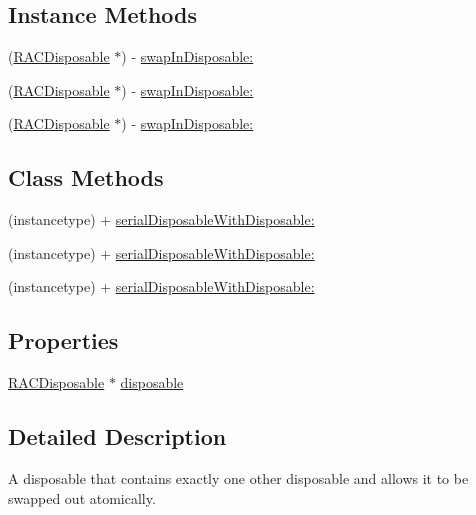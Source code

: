 \subsection*{Instance Methods}
\begin{DoxyCompactItemize}
\item 
(\mbox{\hyperlink{interface_r_a_c_disposable}{R\+A\+C\+Disposable}} $\ast$) -\/ \mbox{\hyperlink{interface_r_a_c_serial_disposable_ad850b6d2134907b94937832f1aea2d20}{swap\+In\+Disposable\+:}}
\item 
(\mbox{\hyperlink{interface_r_a_c_disposable}{R\+A\+C\+Disposable}} $\ast$) -\/ \mbox{\hyperlink{interface_r_a_c_serial_disposable_ad850b6d2134907b94937832f1aea2d20}{swap\+In\+Disposable\+:}}
\item 
(\mbox{\hyperlink{interface_r_a_c_disposable}{R\+A\+C\+Disposable}} $\ast$) -\/ \mbox{\hyperlink{interface_r_a_c_serial_disposable_ad850b6d2134907b94937832f1aea2d20}{swap\+In\+Disposable\+:}}
\end{DoxyCompactItemize}
\subsection*{Class Methods}
\begin{DoxyCompactItemize}
\item 
(instancetype) + \mbox{\hyperlink{interface_r_a_c_serial_disposable_a4d1effa565e832a3d4cea3257745f2c6}{serial\+Disposable\+With\+Disposable\+:}}
\item 
(instancetype) + \mbox{\hyperlink{interface_r_a_c_serial_disposable_a4d1effa565e832a3d4cea3257745f2c6}{serial\+Disposable\+With\+Disposable\+:}}
\item 
(instancetype) + \mbox{\hyperlink{interface_r_a_c_serial_disposable_a4d1effa565e832a3d4cea3257745f2c6}{serial\+Disposable\+With\+Disposable\+:}}
\end{DoxyCompactItemize}
\subsection*{Properties}
\begin{DoxyCompactItemize}
\item 
\mbox{\hyperlink{interface_r_a_c_disposable}{R\+A\+C\+Disposable}} $\ast$ \mbox{\hyperlink{interface_r_a_c_serial_disposable_ab449303ac26a4a3a0555eb9b27e8c5cc}{disposable}}
\end{DoxyCompactItemize}


\subsection{Detailed Description}
A disposable that contains exactly one other disposable and allows it to be swapped out atomically. 

